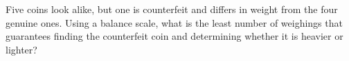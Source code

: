 Five coins look alike, but one is counterfeit and differs in weight from the four genuine ones. Using a balance scale, what is the least number of weighings that guarantees finding the counterfeit coin and determining whether it is heavier or lighter?
